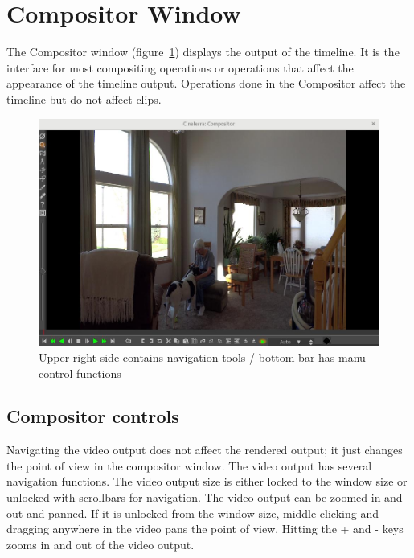 \section{Compositor Window}%
\label{sec:compositor_window}

The Compositor window (figure~\ref{fig:compositor_window}) displays the output of the timeline. 
It is the interface for most compositing operations or operations that affect the appearance of the timeline output. 
Operations done in the Compositor affect the timeline but do not affect clips.

\begin{figure}[htpb]
    \centering
    \includegraphics[width=0.99\linewidth]{images/compositor_window.png}
    \caption{Upper right side contains navigation tools / bottom bar has manu control functions}
    \label{fig:compositor_window}
\end{figure}

\subsection{Compositor controls}%
\label{sub:compositor_controls}


Navigating the video output does not affect the rendered output; it just changes the point of view in the compositor window. 
The video output has several navigation functions. 
The video output size is either locked to the window size or unlocked with scrollbars for navigation. 
The video output can be zoomed in and out and panned. 
If it is unlocked from the window size, middle clicking and dragging anywhere in the video pans the point of view. Hitting the + and - keys zooms in and out of the video output.

